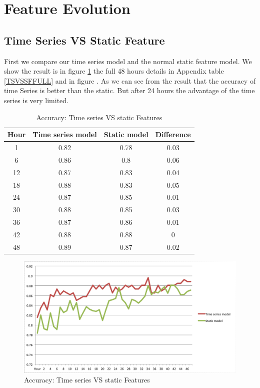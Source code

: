 \newpage
  \section{ Feature Evolution } 
    \subsection{ Time Series VS Static Feature} 

First we compare our time series model and the normal static feature model. We show the result is in figure \ref{TVSF} the full 48 hours details in Appendix table \ref{TSVSSFFULL} and in figure . As we can see from the result that the accuracy of time Series is better than the static. But after 24 hours the advantage of the time series is very limited. 
 
\begin{table}[!h]
\centering
\begin{tabular}{|c|c c |c|}
\hline
Hour & Time series model & Static model & Difference \\ \hline
1    & 0.82              & 0.78         & 0.03       \\
6    & 0.86              & 0.8          & 0.06       \\
12   & 0.87              & 0.83         & 0.04       \\
18   & 0.88              & 0.83         & 0.05       \\
24   & 0.87              & 0.85         & 0.01       \\
30   & 0.88              & 0.85         & 0.03       \\
36   & 0.87              & 0.86         & 0.01          \\
42   & 0.88              & 0.88         & 0          \\
48   & 0.89              & 0.87         & 0.02      \\\hline

\end{tabular}
\caption{Accuracy: Time series VS static Features}
\label{TVSF}
\end{table}

\begin{figure}[!h]
\centering
\includegraphics[width=\columnwidth]{images/Vsstatic.png}
\caption{Accuracy: Time series VS static Features}
\label{fig:TVSF}
\end{figure}

